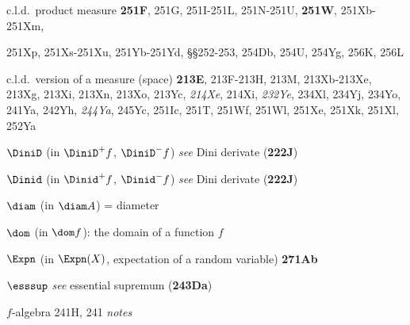 c.l.d.\ product measure {\bf 251F}, 251G,
251I-251L, 
251N-251U, 
{\bf 251W}, 251Xb-251Xm, 
  
251Xp, 251Xs-251Xu, 
251Yb-251Yd, 
\S\S252-253, 254Db, 254U, 254Yg, 256K, 256L


c.l.d.\ version of a measure (space) {\bf 213E},
213F-213H, 
213M, 213Xb-213Xe, 
213Xg, 213Xi, 213Xn, 213Xo, 213Yc, {\it 214Xe}, 214Xi, {\it 232Ye},
234Xl, 234Yj, 234Yo, 241Ya, 242Yh, {\it 244Ya},
245Yc, 251Ic, 251T, 251Wf, 251Wl,
251Xe, 251Xk, 251Xl, 252Ya










\indexmedskip
{}









$\DiniD$ (in $\DiniD^+f$, $\DiniD^-f$) {\it see} Dini derivate
({\bf 222J})


$\Dinid$ (in $\Dinid^+f$, $\Dinid^-f$) {\it see} Dini derivate
({\bf 222J})














$\diam$ (in $\diam A$) = diameter



$\dom$ (in $\dom f$):  the domain of a function $f$

\indexmedskip
{}

$\Expn$ (in $\Expn(X)$, expectation of a random variable)
{\bf 271Ab}



$\esssup$ {\it see} essential supremum ({\bf 243Da})




\indexmedskip
{}





















$f$-algebra 241H, 241 {\it notes\/}


